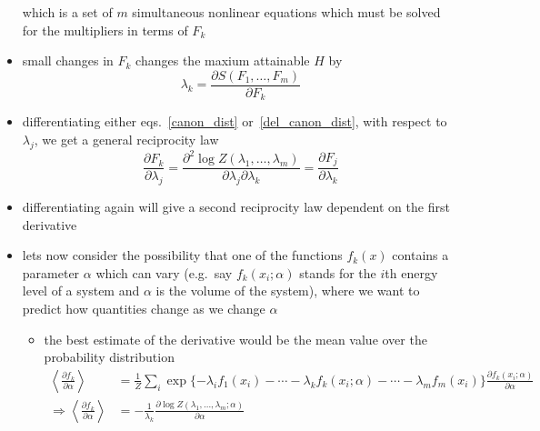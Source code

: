 \documentclass[../jaynes_prob_theory_notes.tex]{subfiles}
\begin{document}
\begin{itemize}
                        which is a set of \(m\) simultaneous nonlinear equations which must be solved for the multipliers in terms of \( F_k \)
                    \item small changes in \( F_k \) changes the maxium attainable \( H \) by
                        \begin{equation} 
                            \label{del_canon_dist}
                            {\lambda}_k = \frac{\partial S(F_1, \ldots, F_m)}{\partial F_k}
                        \end{equation}
                    \item differentiating either eqs.~\ref{canon_dist} or~\ref{del_canon_dist}, with respect to \( \lambda_j \), we get a general reciprocity law
                        \begin{equation*} 
                            \frac{\partial F_k}{\partial \lambda_j} = \frac{\partial^2 \log Z(\lambda_1, \ldots, \lambda_m)}{\partial \lambda_j \partial \lambda_k} = \frac{\partial F_j}{\partial \lambda_k}
                        \end{equation*}
                    \item differentiating again will give a second reciprocity law dependent on the first derivative
                    \item lets now consider the possibility that one of the functions \( f_k (x) \) contains a parameter \( \alpha \) which can vary (e.g.\ say \(f_k (x_i ; \alpha) \) stands for the \(i\)th energy level of a system and \( \alpha \) is the volume of the system), where we want to predict how quantities change as we change \( \alpha \)
                        \begin{itemize} 
                            \item the best estimate of the derivative would be the mean value over the probability distribution
                                \begin{align*} 
                                    \left \langle \frac{\partial f_k}{\partial \alpha} \right \rangle &= \frac{1}{Z} \sum\limits_{i} \exp \{- \lambda_i f_1 (x_i) - \cdots - \lambda_k f_k (x_i ; \alpha) - \cdots - \lambda_m f_m (x_i) \} \frac{\partial f_k (x_i ; \alpha)}{\partial \alpha} \\
                                    \Rightarrow \left \langle \frac{\partial f_k}{\partial \alpha} \right \rangle &= - \frac{1}{\lambda_k} \frac{\partial \log Z(\lambda_1, \ldots, \lambda_m ; \alpha)}{\partial \alpha} 
                                \end{align*}

\end{itemize}
\end{itemize}
\end{document}
